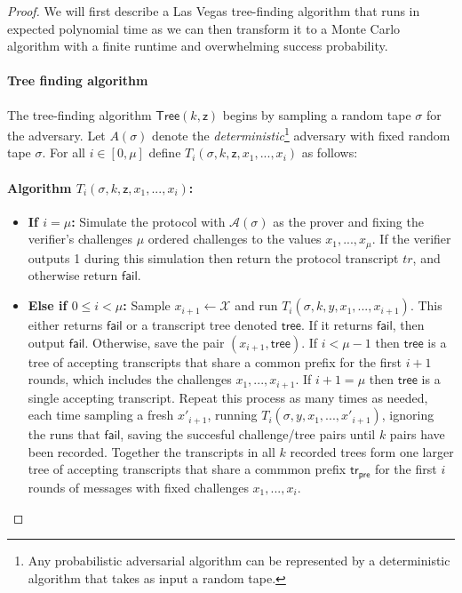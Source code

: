  
 \begin{proof} 
	We will first describe a Las Vegas tree-finding algorithm that runs in expected polynomial time as we can then transform it to a Monte Carlo algorithm with a finite runtime and overwhelming success probability. 

\paragraph{Tree finding algorithm} 
The tree-finding algorithm $\mathsf{Tree}(k,\mathsf{z})$ begins by sampling a random tape $\sigma$ for the adversary. Let $A(\sigma)$ denote the \emph{deterministic}\footnote{Any probabilistic adversarial algorithm can be represented by a deterministic algorithm that takes as input a random tape.} adversary with fixed random tape $\sigma$. For all $i \in [0, \mu]$ define $T_i(\sigma, k, \mathsf{z}, x_1,...,x_i)$ as follows: 

\paragraph{Algorithm $T_i(\sigma, k, \mathsf{z}, x_1,...,x_i)$:}
\begin{itemize}
\item \textbf{If $i = \mu$:} Simulate the protocol with $\mathcal{A}(\sigma)$ as the prover and fixing the verifier's challenges $\mu$ ordered challenges to the values $x_1,...,x_\mu$. If the verifier outputs 1 during this simulation then return the protocol transcript $tr$, and otherwise return $\mathsf{fail}$. 

\item \textbf{Else if $0 \leq i < \mu$:} Sample $x_{i+1} \gets \mathcal{X}$ and run $T_i(\sigma, k,y, x_1,...,x_{i+1})$. This either returns $\mathsf{fail}$ or a transcript tree denoted $\textsf{tree}$. If it returns $\mathsf{fail}$, then output $\mathsf{fail}$. Otherwise, save the pair $(x_{i+1}, \textsf{tree})$. If $i < \mu -1$ then $\textsf{tree}$ is a tree of accepting transcripts that share a common prefix for the first $i+1$ rounds, which includes the challenges $x_1,...,x_{i+1}$. If $i+1 = \mu$ then $\textsf{tree}$ is a single accepting transcript. Repeat this process as many times as needed, each time sampling a fresh $x'_{i+1}$, running $T_i(\sigma, y, x_1,...,x'_{i+1})$, ignoring the runs that $\mathsf{fail}$, saving the succesful challenge/tree pairs until $k$ pairs have been recorded. Together the transcripts in all $k$ recorded trees form one larger tree of accepting transcripts that share a commmon prefix $\textsf{tr}_\textsf{pre}$ for the first $i$ rounds of messages with fixed challenges $x_1,...,x_i$.
\end{itemize}


\end{proof}
